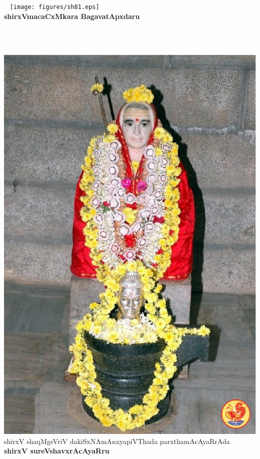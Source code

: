 \thispagestyle{empty}
\begin{center}
~
\vfill
\thispagestyle{empty}
\texttt{[image: figures/sh81.eps]}\\
{\bf shirxVmacaCxMkara BagavatApxdaru}
\vfill
\end{center}
\newpage
~\thispagestyle{empty}
\newpage
\begin{center}
~
\vfill
\thispagestyle{empty}
\includegraphics{figures/sri-sureshwaracharya.eps}\\
shirxV shaqMgeVriV dakiSxNAmAnxyapiVThada parxthamAcAyaRrAda\\ {\bf shirxV sureVshavxrAcAyaRru}
\vfill
\end{center}
\newpage
~\thispagestyle{empty}
\newpage
